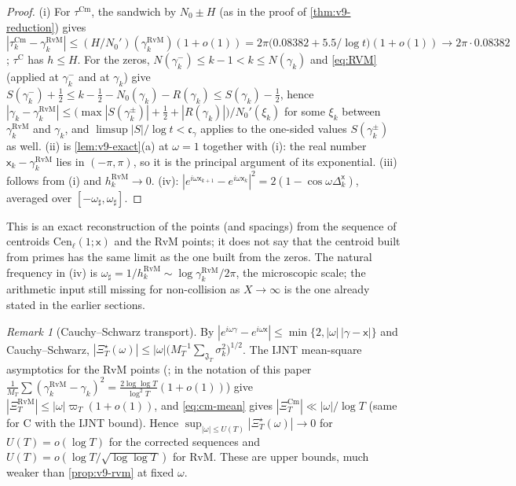 \documentclass[11pt,a4paper]{article}
\numberwithin{equation}{section}
\theoremstyle{definition}
\theoremstyle{remark}
\newtheorem{remark}[theorem]{Remark}
\newcommand{\Cm}{\mathrm{Cm}}
\begin{document}
\begin{proof}
(i) For $\tau^{\Cm}$, the sandwich by $N_0\pm H$ (as in the proof of \cref{thm:v9-reduction}) gives $|\tau_k^{\Cm}-\gamma_k^{\mathrm{RvM}}|\le(H/N_0')(\gamma_k^{\mathrm{RvM}})(1+o(1))=2\pi\bigl(0.08382+5.5/\log t\bigr)(1+o(1))\to2\pi\cdot0.08382$; $\tau^{\mathrm C}$ has $h\le H$. For the zeros, $N(\gamma_k^-)\le k-1<k\le N(\gamma_k)$ and \eqref{eq:RVM} (applied at $\gamma_k^-$ and at $\gamma_k$) give $S(\gamma_k^-)+\frac12\le k-\frac12-N_0(\gamma_k)-R(\gamma_k)\le S(\gamma_k)-\frac12$, hence $|\gamma_k-\gamma_k^{\mathrm{RvM}}|\le\bigl(\max|S(\gamma_k^{\pm})|+\frac12+|R(\gamma_k)|\bigr)/N_0'(\xi_k)$ for some $\xi_k$ between $\gamma_k^{\mathrm{RvM}}$ and $\gamma_k$, and $\limsup|S|/\log t<\mathfrak c_\gamma$ applies to the one-sided values $S(\gamma_k^\pm)$ as well. (ii) is \cref{lem:v9-exact}(a) at $\omega=1$ together with (i): the real number $\mathsf x_k-\gamma_k^{\mathrm{RvM}}$ lies in $(-\pi,\pi)$, so it is the principal argument of its exponential. (iii) follows from (i) and $h_k^{\mathrm{RvM}}\to0$. (iv): $|e^{i\omega\mathsf x_{k+1}}-e^{i\omega\mathsf x_k}|^2=2(1-\cos\omega\Delta_k^{\mathsf x})$, averaged over $[-\omega_\sharp,\omega_\sharp]$.
\end{proof}
This is an exact reconstruction of the points (and spacings) from the sequence of centroids $\mathrm{Cen}_\ell(1;\mathsf x)$ and the RvM points; it does not say that the centroid built from primes has the same limit as the one built from the zeros. The natural frequency in (iv) is $\omega_\sharp=1/h_k^{\mathrm{RvM}}\sim\log\gamma_k^{\mathrm{RvM}}/2\pi$, the microscopic scale; the arithmetic input still missing for non-collision as $X\to\infty$ is the one already stated in the earlier sections.

\begin{remark}[Cauchy--Schwarz transport]\label{rem:v9-cs}
By $|e^{i\omega\gamma}-e^{i\omega\mathsf x}|\le\min\{2,|\omega|\,|\gamma-\mathsf x|\}$ and Cauchy--Schwarz, $|\Xi_T^\star(\omega)|\le|\omega|\bigl(M_T^{-1}\sum_{\mathfrak J_T}\sigma_k^2\bigr)^{1/2}$. The IJNT mean-square asymptotics for the RvM points (\cite{CasanaIJNT}; in the notation of this paper $\frac1{M_T}\sum(\gamma_k^{\mathrm{RvM}}-\gamma_k)^2=\frac{2\log\log T}{\log^2T}(1+o(1))$) give $|\Xi_T^{\mathrm{RvM}}|\le|\omega|\varpi_T(1+o(1))$, and \eqref{eq:cm-mean} gives $|\Xi_T^{\Cm}|\ll|\omega|/\log T$ (same for $\mathrm C$ with the IJNT bound). Hence $\sup_{|\omega|\le U(T)}|\Xi_T^\star(\omega)|\to0$ for $U(T)=o(\log T)$ for the corrected sequences and $U(T)=o(\log T/\sqrt{\log\log T})$ for RvM. These are upper bounds, much weaker than \cref{prop:v9-rvm} at fixed $\omega$.
\end{remark}
\end{document}

